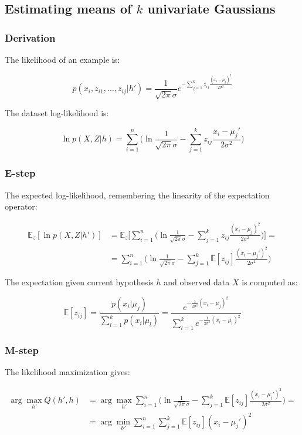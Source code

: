 	\subsection{Estimating means of $k$ univariate Gaussians}

		\subsubsection{Derivation}
		The likelihood of an example is:

		$$p(x_i, z_{i1},\dots,z_{ij}|h') = \frac{1}{\sqrt{2\pi}\sigma}e^{-\sum\limits_{j=1}^k z_{ij}\frac{(x_i-\mu_j)^2}{2\sigma^2}}$$

		The dataset log-likelihood is:

		$$\ln p(X,Z|h) = \sum\limits_{i=1}^n\biggl(\ln\frac{1}{\sqrt{2\pi}\sigma}-\sum\limits_{j=1}^kz_{ij}\frac{x_i-\mu_j'}{2\sigma^2}\biggr)$$

		\subsubsection{E-step}
		The expected log-likelihood, remembering the linearity of the expectation operator:

		\begin{align*}
			\mathbb{E}_z[\ln p(X,Z|h')] &=\mathbb{E}_z\biggl[\sum\limits_{i=1}^n\biggl(\ln\frac{1}{\sqrt{2\pi}\sigma}-\sum\limits_{j=1}^kz_{ij}\frac{(x_i-\mu_j)^2}{2\sigma^2}\biggr)\biggr]=\\
						    &=\sum\limits_{i=1}^n\biggl(\ln\frac{1}{\sqrt{2\pi}\sigma}-\sum\limits_{j=1}^k\mathbb{E}[z_{ij}]\frac{(x_i-\mu_j')^2}{2\sigma^2}\biggr)
		\end{align*}

		The expectation given current hypothesis $h$ and observed data $X$ is computed as:

		$$\mathbb{E}[z_{ij}] = \frac{p(x_i|\mu_j)}{\sum\limits_{l=1}^kp(x_i|\mu_l)} = \frac{e^{-\frac{1}{2\sigma^2}(x_i-\mu_j)^2}}{\sum\limits_{l=1}^ke^{-\frac{1}{2\sigma^2}(x_i-\mu_l)^2}}$$

		\subsubsection{M-step}
		The likelihood maximization gives:

		\begin{align*}
			\arg\max\limits_{h'}Q(h',h) &= \arg\max\limits_{h'}\sum\limits_{i=1}^n\biggl(\ln\frac{1}{\sqrt{2\pi}\sigma}-\sum\limits_{j=1}^k\mathbb{E}[z_{ij}]\frac{(x_i-\mu_j')^2}{2\sigma^2}\biggr)=\\
						    &=\arg\min\limits_{h'}\sum\limits_{i=1}^n\sum\limits_{j=1}^k\mathbb{E}[z_{ij}](x_i-\mu_j')^2
		\end{align*}

